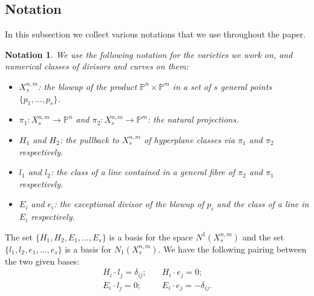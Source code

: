 \documentclass[a4paper,11pt]{article}
\newtheorem{notation}[theorem]{Notation}
\newcommand{\PP}{\mathbb P}
\newcommand{\arrow}{\rightarrow}
\begin{document}
\subsection{Notation}\label{notation}
In this subsection we collect various notations that we use throughout the paper.
\begin{notation}\label{notation:classes}
We use the following notation for the varieties we work on, and numerical classes of divisors and curves on them:
\begin{itemize}
\item $X^{n,m}_s$: the blowup of the product $\PP^n \times \PP^m$ in  a set of $s$ general points $\{p_1,\ldots,p_s\}$.
\item $\pi_1 \colon X^{n,m}_s \arrow \PP^n$ and $\pi_2  \colon X^{n,m}_s \arrow \PP^m$: the natural projections.
\item $H_1$ and $H_2$: the pullback to $X^{n,m}_s$ of hyperplane classes via $\pi_1$ and $\pi_2$ respectively.
\item $l_1$ and $l_2$: the class of a line contained in a general fibre of $\pi_2$ and $\pi_1$ respectively. 
\item $E_i$ and $e_i$: the exceptional divisor of the blowup of $p_i$ and the class of a line in $E_i$ respectively. 
\end{itemize}
\end{notation}
The set $\{H_1,H_2,E_1,\ldots,E_s\}$ is a basis for the space $N^1(X^{n,m}_s)$ and the set $\{l_1,l_2,e_1,...,e_s\}$ is a basis for $N_1(X^{n,m}_s)$. We have the following pairing between the two given bases:
\begin{align*}
  H_i \cdot l_j= \delta_{ij}; &\quad H_i \cdot e_j = 0;\\
  E_i \cdot l_j = 0; &\quad E_i \cdot e_j = -\delta_{ij}.
\end{align*}
\end{document}
